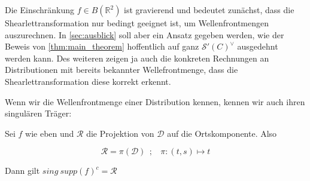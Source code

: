 \begin{remark}
\label{rem:shearlets_no_distributions}
    Die Einschränkung $f \in B(\mathbb{R}^2)$ ist gravierend und bedeutet zunächst, dass die Shearlettransformation nur bedingt geeignet ist, um Wellenfrontmengen auszurechnen. In \cref{sec:ausblick} soll aber ein Ansatz gegeben werden, wie der Beweis von \cref{thm:main_theorem} hoffentlich auf ganz $\mathcal{S}'(C)^\vee$ ausgedehnt werden kann. Des weiteren zeigen ja auch die konkreten Rechnungen an Distributionen mit bereits bekannter Wellefrontmenge, dass die Shearlettransformation diese korrekt erkennt.
\end{remark}
Wenn wir die Wellenfrontmenge einer Distribution kennen, kennen wir auch ihren singulären Träger:

\begin{corollary}
Sei $f$ wie eben und $\mathcal{R}$ die Projektion von $\mathcal{D}$ auf die  Ortskomponente. Also

\begin{equation}
    \mathcal{R} = \pi (\mathcal{D})~~;~~~~
    \pi : (t,s) \mapsto t
\end{equation}

Dann gilt $sing ~supp (f)^c = \mathcal{R}$
\end{corollary}
